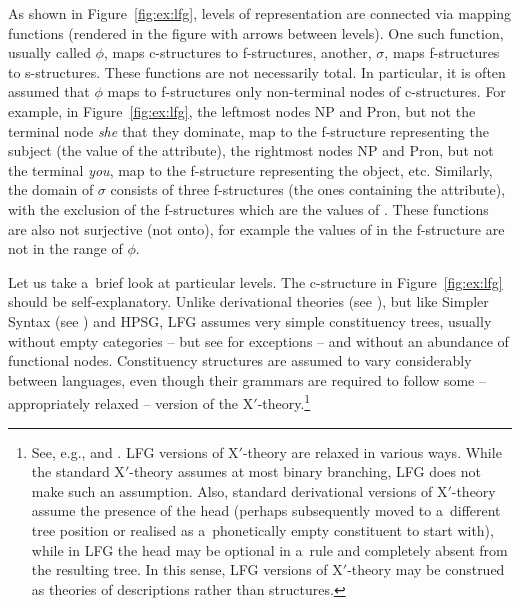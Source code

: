 \documentclass[output=paper,hidelinks]{langscibook}
\begin{document}
As shown in Figure~\ref{fig:ex:lfg}, levels of representation are connected via mapping functions (rendered in the figure with arrows between levels).  One such function, usually called $\phi$, maps c-structures to f-structures, another, $\sigma$, maps f-structures to s-structures.  These functions are not necessarily total.  In particular, it is often assumed that $\phi$ maps to f-structures only non-terminal nodes of c-structures.  For example, in Figure~\ref{fig:ex:lfg}, the leftmost nodes NP and Pron, but not the terminal node \emph{she} that they dominate, map to the f-structure representing the subject (the value of the \SUBJ attribute), the rightmost nodes NP and Pron, but not the terminal \emph{you}, map to the f-structure representing the object, etc.  Similarly, the domain of $\sigma$ consists of three f-structures (the ones containing the \PRED attribute), with the exclusion of the f-structures which are the values of \NINDEX.  These functions are also not surjective (not onto), for example the values of \NINDEX in the f-structure are not in the range of $\phi$.\largerpage[2]

Let us take a~brief look at particular levels.  The c-structure in Figure~\ref{fig:ex:lfg} should be self\hyp{}explanatory.  Unlike derivational theories (see ), but like Simpler Syntax (see ) and HPSG, LFG assumes very simple constituency trees, usually without empty categories -- but see \citet[Chapter {9}]{BresnanEtAl2016} for exceptions -- and without an abundance of functional nodes. Constituency structures are assumed to vary considerably between languages, even though their grammars are required to follow some -- appropriately relaxed -- version of the X$'$-theory.\footnote{See, e.g., \citet[Chapter {6}]{BresnanEtAl2016} and \citet[Section {3.2}]{DLM:LFG}.  LFG versions of X$'$-theory are relaxed in various ways.  While the standard X$'$-theory assumes at most binary branching, LFG does not make such an assumption.  Also, standard derivational versions of X$'$-theory assume the presence of the head (perhaps subsequently moved to a~different tree position or realised as a~phonetically empty constituent to start with), while in LFG the head may be optional in a~rule and completely absent from the resulting tree.  In this sense, LFG versions of X$'$-theory may be construed as theories of descriptions rather than structures.}
\end{document}
